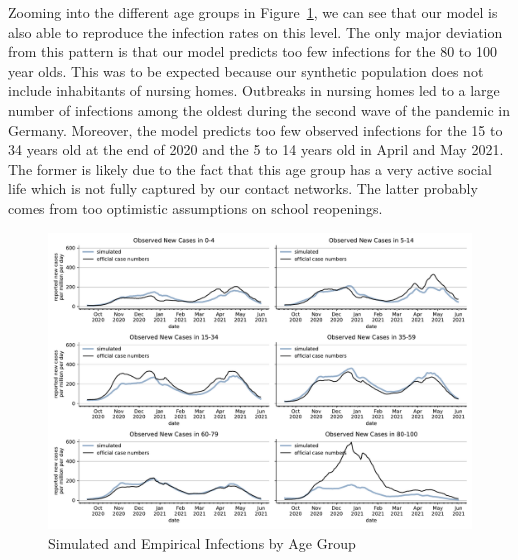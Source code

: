 Zooming into the different age groups in Figure~\ref{fig:age_group_fit}, we can see that
our model is also able to reproduce the infection rates on this level. The only major
deviation from this pattern is that our model predicts too few infections for the 80 to
100 year olds. This was to be expected because our synthetic population does not include
inhabitants of nursing homes. Outbreaks in nursing homes led to a large number of
infections among the oldest during the second wave of the pandemic in Germany. Moreover,
the model predicts too few observed infections for the 15 to 34 years old at the end of
2020 and the 5 to 14 years old in April and May 2021. The former is likely due to the
fact that this age group has a very active social life which is not fully captured by our
contact networks. The latter probably comes from too optimistic assumptions on school reopenings.


\begin{figure}[ht]  %
  \centering
  \includegraphics[width=\textwidth]{figures/results/figures/incidences_by_group/age_group_rki/full_combined_baseline_new_known_case}
  \caption{Simulated and Empirical Infections by Age Group}
  \label{fig:age_group_fit}
\end{figure}


